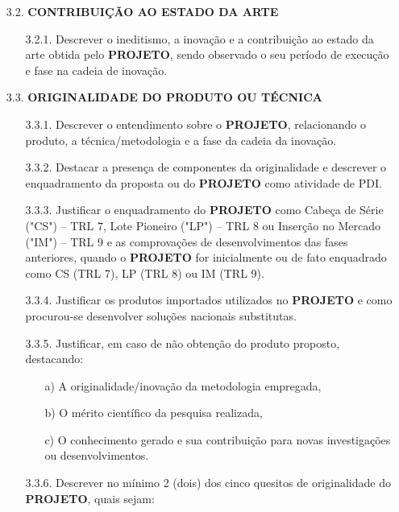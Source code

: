 {\begin{lmarginbox}
\begin{enumerate}[leftmargin=1cm, font=\bfseries]
        \item[3.2.] \textbf{CONTRIBUIÇÃO AO ESTADO DA ARTE}
            \begin{enumerate}[font=\bfseries]
                \item[3.2.1.] Descrever o ineditismo, a inovação e a contribuição ao estado da arte obtida pelo \textbf{PROJETO}, sendo observado o seu período de execução e fase na cadeia de inovação.
            \end{enumerate}

        \item[3.3.]	\textbf{ORIGINALIDADE DO PRODUTO OU TÉCNICA}
            \begin{enumerate}[font=\bfseries]
                \item[3.3.1.] Descrever o entendimento sobre o \textbf{PROJETO}, relacionando o produto, a técnica/metodologia e a fase da cadeia da inovação.
                \item[3.3.2.] Destacar a presença de componentes da originalidade e descrever o enquadramento da proposta ou do \textbf{PROJETO} como atividade de PDI.
                \item[3.3.3.] Justificar o enquadramento do \textbf{PROJETO} como Cabeça de Série ("CS") – TRL 7, Lote Pioneiro ("LP") – TRL 8 ou Inserção no Mercado ("IM") – TRL 9 e as comprovações de desenvolvimentos das fases anteriores, quando o \textbf{PROJETO} for inicialmente ou de fato enquadrado como CS (TRL 7), LP (TRL 8) ou IM (TRL 9).
                \item[3.3.4.] Justificar os produtos importados utilizados no \textbf{PROJETO} e como procurou-se desenvolver soluções nacionais substitutas.
                \item[3.3.5.] Justificar, em caso de não obtenção do produto proposto, destacando:
                    \begin{enumerate}[font=\bfseries]
                        \item[a)] A originalidade/inovação da metodologia empregada,
                        \item[b)] O mérito científico da pesquisa realizada,
                        \item[c)] O conhecimento gerado e sua contribuição para novas investigações ou desenvolvimentos.
                    \end{enumerate}
                \item[3.3.6.] Descrever no mínimo 2 (dois) dos cinco quesitos de originalidade do \textbf{PROJETO}, quais sejam:

\end{enumerate}
\end{enumerate}
\end{lmarginbox}}
